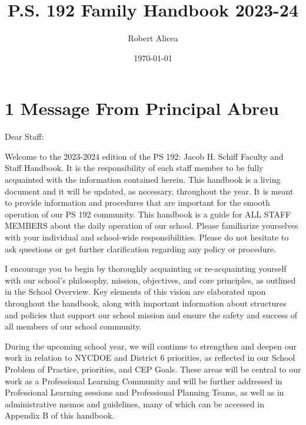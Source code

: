 \documentclass[11pt]{article}
\author{Robert Alicea}
\date{\today}
\title{P.S. 192 Family Handbook 2023-24}
\begin{document}


\pagenumbering{\fancyhf{}}
\pagestyle{headings}

\fancyhead[R]{\thepage}

\pagestyle{fancy}
\renewcommand{\footrulewidth}{1px}


\clearpage
\clearpage \tableofcontents \clearpage

\section{1 Message From Principal Abreu}
\label{sec:org5a2bd40}

Dear Staff:

Welcome to the 2023-2024 edition of the PS 192: Jacob H. Schiff Faculty and Staff Handbook. It is the responsibility of each staff member to be fully acquainted with the information contained herein. This handbook is a living document and it will be updated, as necessary, throughout the year. It is meant to provide information and procedures that are important for the smooth operation of our PS 192 community. This handbook is a guide for ALL STAFF MEMBERS about the daily operation of our school. Please familiarize yourselves with your individual and school-wide responsibilities. Please do not hesitate to ask questions or get further clarification regarding any policy or procedure.

I encourage you to begin by thoroughly acquainting or re-acquainting yourself with our school’s philosophy, mission, objectives, and core principles, as outlined in the School Overview. Key elements of this vision are elaborated upon throughout the handbook, along with important information about structures and policies that support our school mission and ensure the safety and success of all members of our school community.

During the upcoming school year, we will continue to strengthen and deepen our work in relation to NYCDOE and District 6 priorities, as reflected in our School Problem of Practice, priorities, and CEP Goals. These areas will be central to our work as a Professional Learning Community and will be further addressed in Professional Learning sessions and Professional Planning Teams, as well as in administrative memos and guidelines, many of which can be accessed in Appendix B of this handbook.
\end{document}
